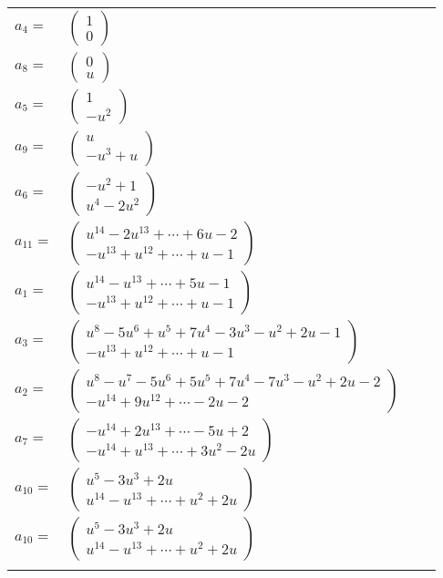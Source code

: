 \documentclass[1p]{elsarticle_modified}
\theoremstyle{definition}
\begin{document}
\begin{tabular}{m{7pt} m{180pt} m{7pt} m{180pt} }
\flushright $a_{4}=$&$\begin{pmatrix}1\\0\end{pmatrix}$ \\
\flushright $a_{8}=$&$\begin{pmatrix}0\\u\end{pmatrix}$ \\
\flushright $a_{5}=$&$\begin{pmatrix}1\\- u^2\end{pmatrix}$ \\
\flushright $a_{9}=$&$\begin{pmatrix}u\\- u^3+u\end{pmatrix}$ \\
\flushright $a_{6}=$&$\begin{pmatrix}- u^2+1\\u^4-2 u^2\end{pmatrix}$ \\
\flushright $a_{11}=$&$\begin{pmatrix}u^{14}-2 u^{13}+\cdots+6 u-2\\- u^{13}+u^{12}+\cdots+u-1\end{pmatrix}$ \\
\flushright $a_{1}=$&$\begin{pmatrix}u^{14}- u^{13}+\cdots+5 u-1\\- u^{13}+u^{12}+\cdots+u-1\end{pmatrix}$ \\
\flushright $a_{3}=$&$\begin{pmatrix}u^8-5 u^6+u^5+7 u^4-3 u^3- u^2+2 u-1\\- u^{13}+u^{12}+\cdots+u-1\end{pmatrix}$ \\
\flushright $a_{2}=$&$\begin{pmatrix}u^8- u^7-5 u^6+5 u^5+7 u^4-7 u^3- u^2+2 u-2\\- u^{14}+9 u^{12}+\cdots-2 u-2\end{pmatrix}$ \\
\flushright $a_{7}=$&$\begin{pmatrix}- u^{14}+2 u^{13}+\cdots-5 u+2\\- u^{14}+u^{13}+\cdots+3 u^2-2 u\end{pmatrix}$ \\
\flushright $a_{10}=$&$\begin{pmatrix}u^5-3 u^3+2 u\\u^{14}- u^{13}+\cdots+u^2+2 u\end{pmatrix}$\\ \flushright $a_{10}=$&$\begin{pmatrix}u^5-3 u^3+2 u\\u^{14}- u^{13}+\cdots+u^2+2 u\end{pmatrix}$\\&\end{tabular}
\end{document}
